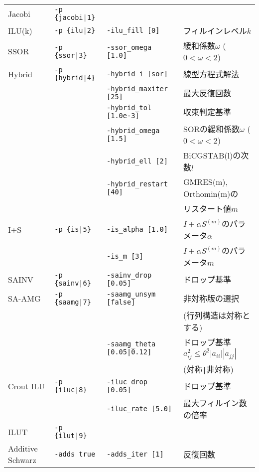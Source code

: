 \documentclass[a4paper]{jarticle}
\begin{document}
{{\begin{minipage}[t]{\textwidth}
\begin{center}
\begin{tabular}{l|lll}
Jacobi   & \verb=-p {jacobi|1}=  &     \\
ILU(k)   & \verb=-p {ilu|2}=     & \verb=-ilu_fill [0]=    & フィルインレベル$k$ \\
SSOR     & \verb=-p {ssor|3}=    & \verb=-ssor_omega [1.0]=    & 緩和係数$\omega$ ($0<\omega<2$) \\
Hybrid   & \verb=-p {hybrid|4}=  & \verb=-hybrid_i [sor]=  & 線型方程式解法 \\
         &                       & \verb=-hybrid_maxiter [25]= & 最大反復回数 \\
         &                       & \verb=-hybrid_tol [1.0e-3]= & 収束判定基準 \\
         &                       & \verb=-hybrid_omega [1.5]=  & SORの緩和係数$\omega$ ($0<\omega<2$) \\
         &                       & \verb=-hybrid_ell [2]=      & BiCGSTAB(l)の次数$l$\\
         &                       & \verb=-hybrid_restart [40]= & GMRES(m), Orthomin(m)の \\
         &                       &                             & リスタート値$m$ \\
I+S      & \verb=-p {is|5}=      & \verb=-is_alpha [1.0]=  & $I+\alpha S^{(m)}$のパラメータ$\alpha$ \\
         &                       & \verb=-is_m [3]=        & $I+\alpha S^{(m)}$のパラメータ$m$ \\
SAINV    & \verb=-p {sainv|6}=   & \verb=-sainv_drop [0.05]=    & ドロップ基準\\
SA-AMG   & \verb=-p {saamg|7}=   & \verb=-saamg_unsym [false]=     & 非対称版の選択 \\
         &                       &                                 & (行列構造は対称とする) \\
         &                       & \verb=-saamg_theta [0.05|0.12]= & ドロップ基準 $a^2_{ij}\le\theta^2|a_{ii}||a_{jj}|$ \\
         &                       &                             & (対称\verb=|=非対称) \\
Crout ILU& \verb=-p {iluc|8}=    & \verb=-iluc_drop [0.05]=    & ドロップ基準    \\
         &                       & \verb=-iluc_rate [5.0]=     & 最大フィルイン数の倍率 \\
ILUT     & \verb=-p {ilut|9}=    &     \\
Additive Schwarz  & \verb=-adds true=   &  \verb=-adds_iter [1]= & 反復回数   \\

\end{tabular}
\end{center}
\end{minipage}}}
\end{document}
